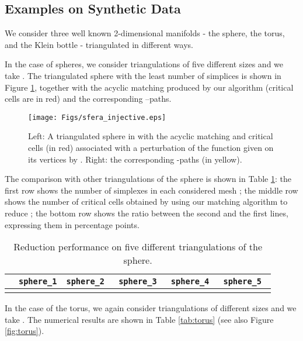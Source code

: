 \documentclass[12pt]{article}
\begin{document}
\subsection{Examples on Synthetic Data}

We consider three well known 2-dimensional manifolds - the sphere, the torus, and the Klein bottle - triangulated in different ways.

In the case of spheres, we consider triangulations of five different sizes and we take
. The triangulated sphere with the least number of simplices is shown in Figure \ref{fig:sphere}, together with the acyclic matching produced by our algorithm (critical cells are in red) and the corresponding --paths.

\begin{figure}[t]
\begin{center}
\texttt{[image: Figs/sfera\_injective.eps]}
  \caption{Left: A triangulated sphere  in  with the acyclic matching and  critical cells (in red)  associated with a perturbation of the function  given on its vertices by . Right: the corresponding -paths (in yellow).
 }
\end{center}
\label{fig:sphere}
\end{figure}




The comparison with other triangulations of the sphere is shown in Table \ref{tab:sphere}:  the first row  shows  the number of  simplexes in each considered mesh ; the middle row shows the number of critical cells  obtained by using our matching algorithm to reduce ; the bottom row shows the ratio between the second and the first lines, expressing them in percentage points.

\begin{table}[h]
\caption{Reduction performance on five different triangulations of the sphere. }
\begin{center}
\begin{tabular}{| c | c | c | c | c |c|}
\hline
 & \tt{sphere\_1}&
 \tt{sphere\_2} & \tt{sphere\_3}
 &  \tt{sphere\_4} & \tt{sphere\_5} \\
 \hline
   &
  &
  &
  &
 &
 \\
 \hline
 \end{tabular}
 \end{center}
\label{tab:sphere}
\end{table}

In the case of the torus, we again consider triangulations of different sizes and we take
. The numerical results are shown in Table \ref{tab:torus} (see also Figure \ref{fig:torus}).
\end{document}
